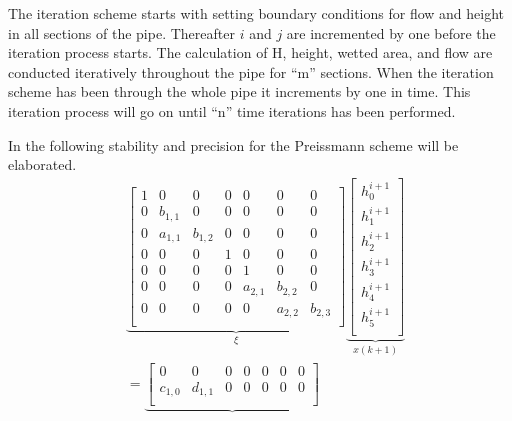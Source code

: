 The iteration scheme starts with setting boundary conditions for flow and height in all sections of the pipe. Thereafter $i$ and $j$ are incremented by one before the iteration process starts. The calculation of H, height, wetted area, and flow are conducted iteratively throughout the pipe for ``m'' sections.
When the iteration scheme has been through the whole pipe it increments by one in time. This iteration process will go on until ``n'' time iterations has been performed.   

In the following stability and precision for the Preissmann scheme will be elaborated. %
\begin{equation}
\begin{aligned}
      & \underbrace{\begin{bmatrix}
            1 & 0       & 0         &0          &0          &0   &0\\
            0 & b_{1,1} & 0         &0          &0          &0  &0\\
            0 &a_{1,1}  & b_{1,2}   & 0         &0          &0 &0\\
            0 &0        & 0         & 1         & 0         &0      &0\\
             0 &0        & 0         &  0        & 1         &0   & 0        \\
            0 & 0       &0          &  0         &a_{2,1}    &  b_{2,2}&0       \\
            0 & 0       & 0         &   0        &     0      & a_{2,2}  & b_{2,3}\\  
       \end{bmatrix}}_{\xi}
        \underbrace{\begin{bmatrix}
        h_{0}^{i+1}\\
        h_{1}^{i+1} \\
        h_{2}^{i+1} \\ 
        h_{3}^{i+1} \\          
        h_{4}^{i+1}     \\
        h_{5}^{i+1}\\
    \end{bmatrix}}_{x(k+1)}
    \\ &=
    \underbrace{\begin{bmatrix}
        0       &  0    &   0    & 0     &0         &0          &0 \\
        c_{1,0} &d_{1,1}&   0    &  0    &0         &0          &0\\

\end{bmatrix}}
\end{aligned}
\end{equation}

